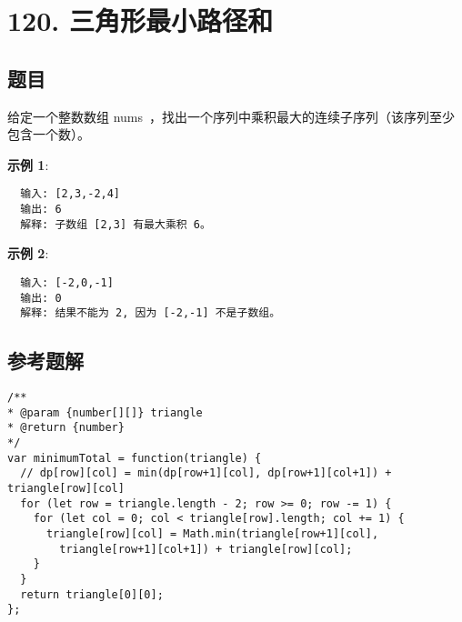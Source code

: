 \newpage
\section{120. 三角形最小路径和}
\label{leetcode:120}

\subsection{题目}

给定一个整数数组 nums ，找出一个序列中乘积最大的连续子序列（该序列至少包含一个数）。

\textbf{示例 1}:

\begin{verbatim}
  输入: [2,3,-2,4]
  输出: 6
  解释: 子数组 [2,3] 有最大乘积 6。
\end{verbatim}

\textbf{示例 2}:

\begin{verbatim}
  输入: [-2,0,-1]
  输出: 0
  解释: 结果不能为 2, 因为 [-2,-1] 不是子数组。
\end{verbatim}

\subsection{参考题解}

\begin{verbatim}
/**
* @param {number[][]} triangle
* @return {number}
*/
var minimumTotal = function(triangle) {
  // dp[row][col] = min(dp[row+1][col], dp[row+1][col+1]) + triangle[row][col]
  for (let row = triangle.length - 2; row >= 0; row -= 1) {
    for (let col = 0; col < triangle[row].length; col += 1) {
      triangle[row][col] = Math.min(triangle[row+1][col],
        triangle[row+1][col+1]) + triangle[row][col];
    }
  }
  return triangle[0][0];
};
\end{verbatim}
